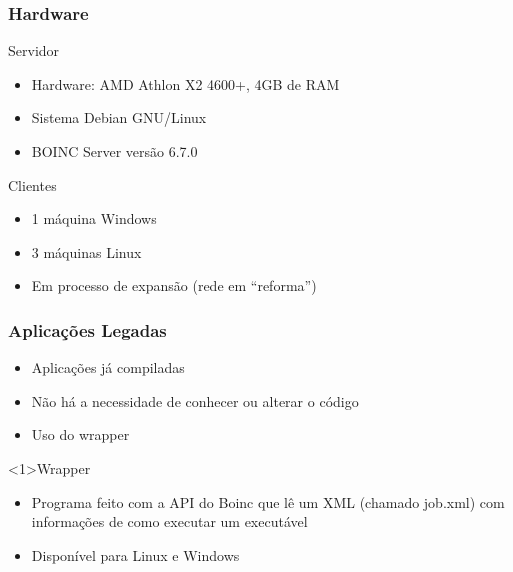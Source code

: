 \documentclass{beamer}
\begin{document}
\begin{frame}
  \frametitle{Hardware}
  \begin{block}{Servidor}
    \begin{itemize}
      \item Hardware: AMD Athlon X2 4600+, 4GB de RAM %
      \item Sistema Debian GNU/Linux
      \item BOINC Server versão 6.7.0
    \end{itemize}
  \end{block}
  \begin{block}{Clientes}
  \begin{itemize}
    \item 1 máquina Windows
    \item 3 máquinas Linux
    \item Em processo de expansão (rede em ``reforma'')
  \end{itemize}
  \end{block}
\end{frame}

\begin{frame}
  \frametitle{Aplicações Legadas}
  \begin{itemize}
    \item Aplicações já compiladas
    \item Não há a necessidade de conhecer ou alterar o código
    \item Uso do wrapper
  \end{itemize}
  \begin{block}<1>{Wrapper}
    \begin{itemize}
      \item Programa feito com a API do Boinc que lê um XML (chamado job.xml)  com informações de como executar um executável
      \item Disponível para Linux e Windows
    \end{itemize}
  \end{block}
\end{frame}

\end{document}
